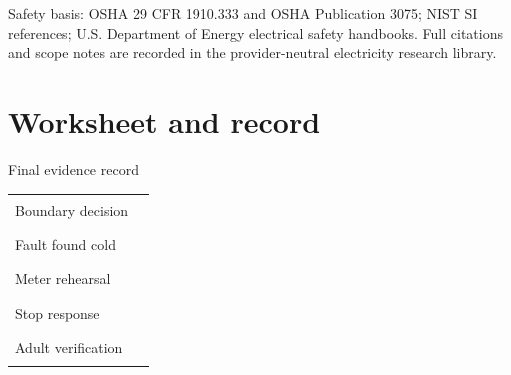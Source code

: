 {\footnotesize Safety basis: OSHA 29 CFR 1910.333 and OSHA Publication 3075;
NIST SI references; U.S. Department of Energy electrical safety handbooks.
Full citations and scope notes are recorded in the provider-neutral electricity
research library.}

\section{Worksheet and record}

\begin{teloscard}{Final evidence record}
\begin{tabularx}{\linewidth}{@{}p{.24\linewidth}L@{}}
Boundary decision & \rule{.96\linewidth}{.3pt}\\[.55em]
Fault found cold & \rule{.96\linewidth}{.3pt}\\[.55em]
Meter rehearsal & \rule{.96\linewidth}{.3pt}\\[.55em]
Stop response & \rule{.96\linewidth}{.3pt}\\[.55em]
Adult verification & \rule{.96\linewidth}{.3pt}
\end{tabularx}
\end{teloscard}

\endgroup


